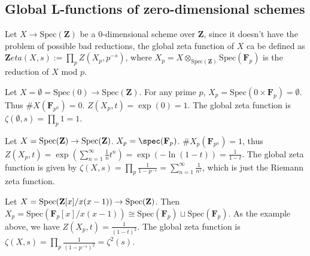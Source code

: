 \documentclass[../main.tex]{subfiles}
\begin{document}
\subsection{Global L-functions of zero-dimensional schemes}
Let $X\rightarrow \mathrm{Spec}(\mathbf{Z})$ be a $0$-dimensional scheme over $\mathbf{Z}$, since it doesn't have the problem of possible bad reductions, the global zeta function of $X$ ca be defined as $\mathbf{Z}eta(X, s):=\prod_{p} Z(X_{p}, p^{-s})$, where $X_{p}=X\otimes_{\mathrm{Spec}(\mathbf{Z})}\mathrm{Spec}(\mathbf{F}_{p})$ is the reduction of $X$ mod $p$.
\begin{example}
Let $X=\emptyset=\mathrm{Spec}(0)\rightarrow \mathrm{Spec}(\mathbf{Z})$. For any prime $p$, $X_{p}=\mathrm{Spec}(0\times \mathbf{F}_{p})=\emptyset$. Thus $\# X(\mathbf{F}_{p^{n}})=0$. $Z(X_{p}, t)=\exp(0)=1$. The global zeta function is $\zeta(\emptyset, s)=\prod_{p}1=1$.
\end{example}
\begin{example}
Let $X=\mathrm{Spec}(\mathbf{Z})\rightarrow \mathrm{Spec}(\mathbf{Z})$. $X_{p}=\spec(\mathbf{F}_{p})$. $\# X_{p}(\mathbf{F}_{p^{n}})=1$, thus $Z(X_{p}, t)=\exp(\sum_{n=1}^{\infty}\frac{1}{n}t^{n})=\exp(-\ln(1-t))=\frac{1}{1-t}$. The global zeta function is given by $\zeta(X, s)=\prod_{p}\frac{1}{1-p^{-s}}=\sum_{n=1}^{\infty}\frac{1}{n^{s}}$, which is just the Riemann zeta function. 
\end{example}
\begin{example}
Let $X=\mathrm{Spec}(\mathbf{Z}[x]/x(x-1))\rightarrow \mathrm{Spec}(\mathbf{Z})$. Then $X_{p}=\mathrm{Spec}(\mathbf{F}_{p}[x]/x(x-1))\cong \mathrm{Spec}(\mathbf{F}_{p})\sqcup \mathrm{Spec}(\mathbf{F}_{p})$. As the example above, we have $Z(X_{p}, t)=\frac{1}{(1-t)^{2}}$. The global zeta function is $\zeta(X,s)=\prod_{p}\frac{1}{(1-p^{-s})^{2}}=\zeta^{2}(s)$.
\end{example}
\end{document}
